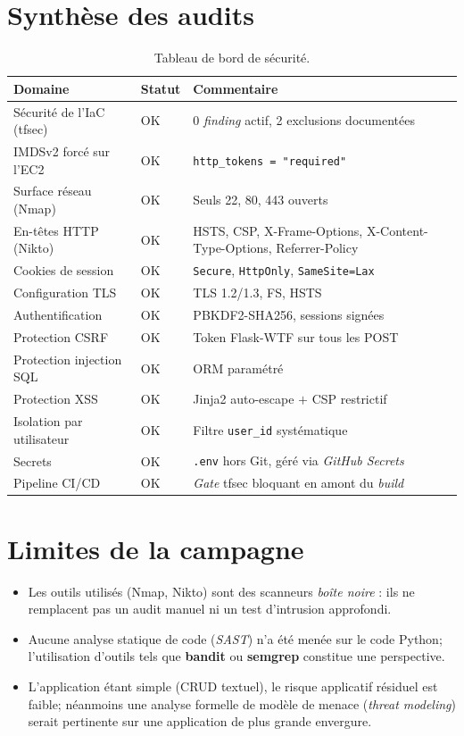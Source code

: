 \section{Synthèse des audits}

\begin{table}[H]
\centering
\caption{Tableau de bord de sécurité.}
\begin{tabular}{P{5cm} C{2cm} P{6cm}}
\toprule
\textbf{Domaine} & \textbf{Statut} & \textbf{Commentaire} \\
\midrule
Sécurité de l'IaC (tfsec)     & OK & 0 \emph{finding} actif, 2 exclusions documentées \\
IMDSv2 forcé sur l'EC2        & OK & \texttt{http\_tokens = "required"} \\
Surface réseau (Nmap)         & OK & Seuls 22, 80, 443 ouverts \\
En-têtes HTTP (Nikto)         & OK & HSTS, CSP, X-Frame-Options, X-Content-Type-Options, Referrer-Policy \\
Cookies de session            & OK & \texttt{Secure}, \texttt{HttpOnly}, \texttt{SameSite=Lax} \\
Configuration TLS             & OK & TLS 1.2/1.3, FS, HSTS \\
Authentification              & OK & PBKDF2-SHA256, sessions signées \\
Protection CSRF                & OK & Token Flask-WTF sur tous les POST \\
Protection injection SQL       & OK & ORM paramétré \\
Protection XSS                 & OK & Jinja2 auto-escape \(+\) CSP restrictif \\
Isolation par utilisateur      & OK & Filtre \texttt{user\_id} systématique \\
Secrets                        & OK & \texttt{.env} hors Git, géré via \emph{GitHub Secrets} \\
Pipeline CI/CD                 & OK & \emph{Gate} tfsec bloquant en amont du \emph{build} \\
\bottomrule
\end{tabular}
\end{table}

\section{Limites de la campagne}

\begin{itemize}
  \item Les outils utilisés (Nmap, Nikto) sont des scanneurs
        \emph{boîte noire} : ils ne remplacent pas un audit manuel ni
        un test d'intrusion approfondi.
  \item Aucune analyse statique de code (\emph{SAST}) n'a été menée
        sur le code Python; l'utilisation d'outils tels que
        \textbf{bandit} ou \textbf{semgrep} constitue une perspective.
  \item L'application étant simple (CRUD textuel), le risque applicatif
        résiduel est faible; néanmoins une analyse formelle de modèle
        de menace (\textit{threat modeling}) serait pertinente sur une
        application de plus grande envergure.
\end{itemize}

